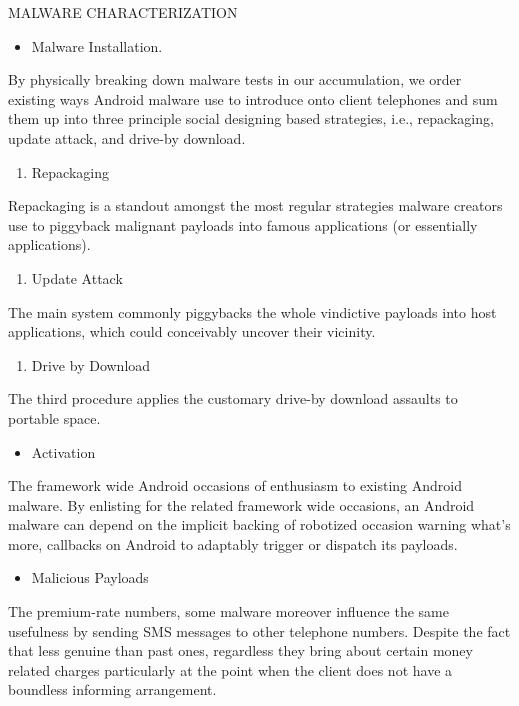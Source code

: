 \documentclass{article}
\begin{document}
MALWARE CHARACTERIZATION
\begin{itemize}
\item Malware Installation.
\end{itemize}
\begin{center}
By physically breaking down malware tests in our accumulation, we order existing ways Android malware use to introduce onto client telephones and sum them up into three principle social designing based strategies, i.e., repackaging, update attack, and drive-by download.
\end{center}
\begin{enumerate}
\item Repackaging
\end{enumerate}
\begin{center}
Repackaging is a standout amongst the most regular strategies malware creators use to piggyback malignant payloads into famous applications (or essentially applications).
\end{center}
\begin{enumerate}
\item Update Attack
\end{enumerate}
\begin{center}
The main system commonly piggybacks the whole vindictive payloads into host applications, which could conceivably uncover their vicinity.
\end{center}
\begin{enumerate}
\item Drive by Download
\end{enumerate}
\begin{center}
The third procedure applies the customary drive-by download assaults to portable space.
\end{center}
\begin{itemize}
\item Activation
\end{itemize}
\begin{center}
The framework wide Android occasions of enthusiasm to existing Android malware. By enlisting for the related framework wide occasions, an Android malware can depend on the implicit backing of robotized occasion warning what's more, callbacks on Android to adaptably trigger or dispatch its payloads.
\end{center}
\begin{itemize}
\item Malicious Payloads
\end{itemize}
\begin{center}
The premium-rate numbers, some malware moreover influence the same usefulness by sending SMS messages to other telephone numbers. Despite the fact that less genuine than past ones, regardless they bring about certain money related charges particularly at the point when the client does not have a boundless informing arrangement.
\end{center}
\end{document}
